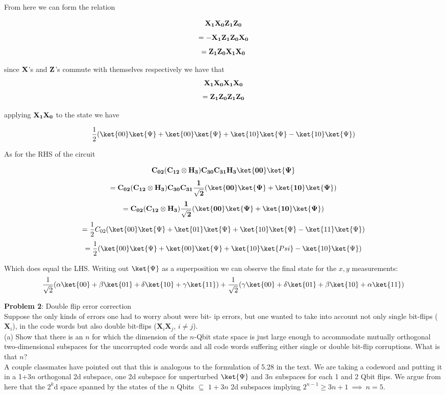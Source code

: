 From here we can form the relation

$$\bf{X}_1\bf{X}_0\bf{Z}_1\bf{Z}_0$$
$$=-\bf{X}_1\bf{Z}_1\bf{Z}_0\bf{X}_0$$
$$=\bf{Z}_1\bf{Z}_0\bf{X}_1\bf{X}_0$$

since $\bf{X}$'s and $\bf{Z}$'s commute with themselves respectively we have
that
$$\bf{X}_1\bf{X}_0\bf{X}_1\bf{X}_0$$
$$=\bf{Z}_1\bf{Z}_0\bf{Z}_1\bf{Z}_0$$

applying $\bf{X}_1\bf{X}_0$ to the state we have

$$\frac{1}{2}(\ket{00}\ket{\Psi}+\ket{00}\ket{\Psi}+\ket{10}\ket{\Psi}-\ket{10}\ket{\Psi})$$

As for the RHS of the circuit

$$\bf{C}_{02}(\bf{C}_{12}\otimes \bf{H}_3)\bf{C}_{30}\bf{C}_{31}\bf{H}_3 \ket{00}\ket{\Psi}$$
$$=\bf{C}_{02}(C_{12}\otimes
H_3)C_{30}C_{31}\frac{1}{\sqrt{2}}(\ket{00}\ket{\Psi}+\ket{10}\ket{\Psi})$$
$$=\bf{C}_{02}(C_{12}\otimes
H_3)\frac{1}{\sqrt{2}}(\ket{00}\ket{\Psi}+\ket{10}\ket{\Psi})$$
$$=\frac{1}{2}C_{02}(\ket{00}\ket{\Psi}+\ket{01}\ket{\Psi}+\ket{10}\ket{\Psi}-\ket{11}\ket{\Psi})$$
$$=\frac{1}{2}(\ket{00}\ket{\Psi}+\ket{00}\ket{\Psi}+\ket{10}\ket{Psi}-\ket{10}\ket{\Psi})$$

Which does equal the LHS. Writing out $\ket{\Psi}$ as a superposition we can
observe the final state for the $x,y$ measurements:
$$\frac{1}{\sqrt{2}}(\alpha\ket{00}+\beta\ket{01}+\delta\ket{10}+\gamma\ket{11})+\frac{1}{\sqrt{2}}(\gamma\ket{00}+\delta\ket{01}+\beta\ket{10}+\alpha\ket{11})$$

\textbf{Problem 2}: Double flip error correction\\

Suppose the only kinds of errors one had to worry about were bit-
ip errors, but one
wanted to take into account not only single bit-flips ($\textbf{X}_i$), in the
code words but also double bit-flips ($\textbf{X}_i\textbf{X}_j$,
$i\not=j$).\\

(a) Show that there is an $n$ for which the dimension of the $n$-Qbit state space is
just large enough to accommodate mutually orthogonal two-dimensional
subspaces for
the uncorrupted code words and all code words suffering either single or double
bit-flip
corruptions. What is that $n$?\\

A couple classmates have pointed out that this is analogous to the
formulation of 5.28 in the text. We are taking a codeword and putting it in a
1+3$n$ orthogonal 2d subspace, one 2d subspace for unperturbed
$\ket{\Psi}$ and $3n$ subspaces for each 1 and 2 Qbit flips. We argue from
here that the $2^k$d space spanned by the states of the $n$ Qbits
$\subseteq$  $1+3n$ 2d subspaces implying $2^{n-1}\geq3n+1~\implies~n=5$.\\


